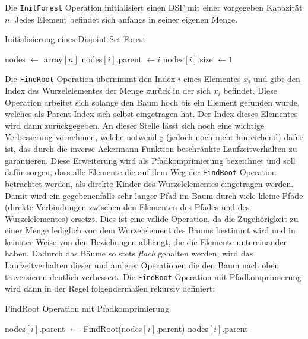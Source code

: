 \documentclass{whswinvcbook}
\begin{document}
Die \texttt{InitForest} Operation initialisiert einen DSF mit einer vorgegeben Kapazität $n$. Jedes Element befindet sich anfangs in seiner eigenen Menge.
\begin{algorithm}[H]
    \caption{Initialisierung eines Disjoint-Set-Forest}\label{alg-dsf-init}
    \begin{algorithmic}
            \State nodes $\gets$ array$[n]$
                \State nodes$[i]$.parent $\gets i$
                \State nodes$[i]$.size $\gets 1$
            \EndFor
        \EndProcedure
    \end{algorithmic}
\end{algorithm}
Die \texttt{FindRoot} Operation übernimmt den Index $i$ eines Elementes $x_i$ und gibt den Index des Wurzelelementes der Menge zurück in der sich $x_i$ befindet. Diese Operation arbeitet sich solange den Baum hoch bis ein Element gefunden wurde, welches als Parent-Index sich selbst eingetragen hat. Der Index dieses Elementes wird dann zurückgegeben. An dieser Stelle lässt sich noch eine wichtige Verbesserung vornehmen, welche notwendig (jedoch noch nicht hinreichend) dafür ist, das durch die inverse Ackermann-Funktion beschränkte Laufzeitverhalten zu garantieren. Diese Erweiterung wird als Pfadkomprimierung bezeichnet und soll dafür sorgen, dass alle Elemente die auf dem Weg der \texttt{FindRoot} Operation betrachtet werden, als direkte Kinder des Wurzelelementes eingetragen werden. Damit wird ein gegebenenfalls sehr langer Pfad im Baum durch viele kleine Pfade (direkte Verbindungen zwischen den Elementen des Pfades und des Wurzelelementes) ersetzt. Dies ist eine valide Operation, da die Zugehörigkeit zu einer Menge lediglich von dem Wurzelelement des Baums bestimmt wird und in keinster Weise von den Beziehungen abhängt, die die Elemente untereinander haben. Dadurch das Bäume so stets \textit{flach} gehalten werden, wird das Laufzeitverhalten dieser und anderer Operationen die den Baum nach oben traversieren deutlich verbessert. Die \texttt{FindRoot} Operation mit Pfadkomprimierung wird dann in der Regel folgendermaßen rekursiv definiert:
\begin{algorithm}[H]
    \caption{FindRoot Operation mit Pfadkomprimierung}\label{alg-dsf-find}
    \begin{algorithmic}
                \State nodes$[i]$.parent $\gets$ FindRoot(nodes$[i]$.parent)
            \EndIf
            \State \Return nodes$[i]$.parent
        \EndFunction
    \end{algorithmic}
\end{algorithm}
\end{document}

